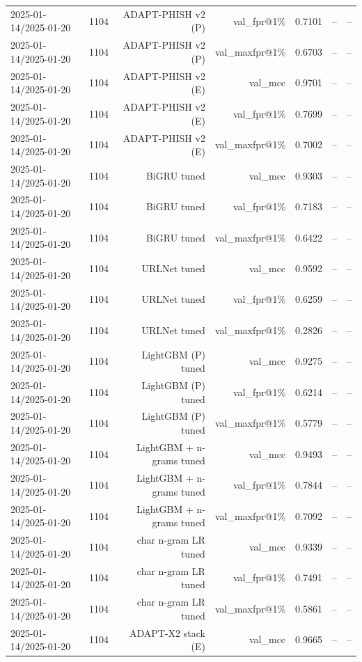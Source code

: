 \begin{table}[t]
\begin{tabular}{llrrrrr}
2025-01-14/2025-01-20 & 1104 & ADAPT-PHISH v2 (P) & val\_fpr@1\% & 0.7101 & -- & -- \\
2025-01-14/2025-01-20 & 1104 & ADAPT-PHISH v2 (P) & val\_maxfpr@1\% & 0.6703 & -- & -- \\
2025-01-14/2025-01-20 & 1104 & ADAPT-PHISH v2 (E) & val\_mcc & 0.9701 & -- & -- \\
2025-01-14/2025-01-20 & 1104 & ADAPT-PHISH v2 (E) & val\_fpr@1\% & 0.7699 & -- & -- \\
2025-01-14/2025-01-20 & 1104 & ADAPT-PHISH v2 (E) & val\_maxfpr@1\% & 0.7002 & -- & -- \\
2025-01-14/2025-01-20 & 1104 & BiGRU tuned & val\_mcc & 0.9303 & -- & -- \\
2025-01-14/2025-01-20 & 1104 & BiGRU tuned & val\_fpr@1\% & 0.7183 & -- & -- \\
2025-01-14/2025-01-20 & 1104 & BiGRU tuned & val\_maxfpr@1\% & 0.6422 & -- & -- \\
2025-01-14/2025-01-20 & 1104 & URLNet tuned & val\_mcc & 0.9592 & -- & -- \\
2025-01-14/2025-01-20 & 1104 & URLNet tuned & val\_fpr@1\% & 0.6259 & -- & -- \\
2025-01-14/2025-01-20 & 1104 & URLNet tuned & val\_maxfpr@1\% & 0.2826 & -- & -- \\
2025-01-14/2025-01-20 & 1104 & LightGBM (P) tuned & val\_mcc & 0.9275 & -- & -- \\
2025-01-14/2025-01-20 & 1104 & LightGBM (P) tuned & val\_fpr@1\% & 0.6214 & -- & -- \\
2025-01-14/2025-01-20 & 1104 & LightGBM (P) tuned & val\_maxfpr@1\% & 0.5779 & -- & -- \\
2025-01-14/2025-01-20 & 1104 & LightGBM + n-grams tuned & val\_mcc & 0.9493 & -- & -- \\
2025-01-14/2025-01-20 & 1104 & LightGBM + n-grams tuned & val\_fpr@1\% & 0.7844 & -- & -- \\
2025-01-14/2025-01-20 & 1104 & LightGBM + n-grams tuned & val\_maxfpr@1\% & 0.7092 & -- & -- \\
2025-01-14/2025-01-20 & 1104 & char n-gram LR tuned & val\_mcc & 0.9339 & -- & -- \\
2025-01-14/2025-01-20 & 1104 & char n-gram LR tuned & val\_fpr@1\% & 0.7491 & -- & -- \\
2025-01-14/2025-01-20 & 1104 & char n-gram LR tuned & val\_maxfpr@1\% & 0.5861 & -- & -- \\
2025-01-14/2025-01-20 & 1104 & ADAPT-X2 stack (E) & val\_mcc & 0.9665 & -- & -- \\

\end{tabular}
\end{table}
